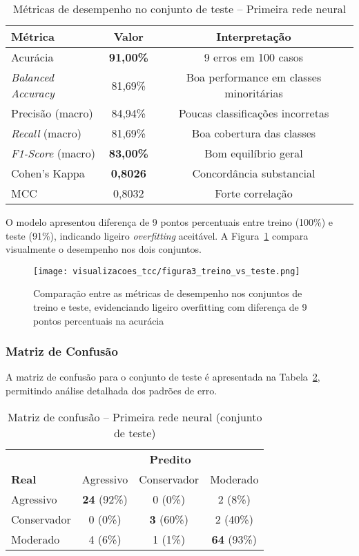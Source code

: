 \begin{table}[htbp]
\centering
\caption{Métricas de desempenho no conjunto de teste -- Primeira rede neural}
\label{tab:metricas_teste_primeira_rede}
\begin{tabular}{@{}lcc@{}}
\toprule
\textbf{Métrica} & \textbf{Valor} & \textbf{Interpretação} \\ \midrule
Acurácia & \textbf{91,00\%} & 9 erros em 100 casos \\
\textit{Balanced Accuracy} & 81,69\% & Boa performance em classes minoritárias \\
Precisão (macro) & 84,94\% & Poucas classificações incorretas \\
\textit{Recall} (macro) & 81,69\% & Boa cobertura das classes \\
\textit{F1-Score} (macro) & \textbf{83,00\%} & Bom equilíbrio geral \\
Cohen's Kappa & \textbf{0,8026} & Concordância substancial \\
MCC & 0,8032 & Forte correlação \\ \bottomrule
\end{tabular}
\end{table}

O modelo apresentou diferença de 9 pontos percentuais entre treino (100\%) e teste (91\%), indicando ligeiro \textit{overfitting} aceitável. A Figura~\ref{fig:treino_vs_teste} compara visualmente o desempenho nos dois conjuntos.

\begin{figure}[htbp]
    \centering
    \texttt{[image: visualizacoes\_tcc/figura3\_treino\_vs\_teste.png]}
    \caption{Comparação entre as métricas de desempenho nos conjuntos de treino e teste, evidenciando ligeiro overfitting com diferença de 9 pontos percentuais na acurácia}
    \label{fig:treino_vs_teste}
\end{figure}

\subsubsection{Matriz de Confusão}

A matriz de confusão para o conjunto de teste é apresentada na Tabela~\ref{tab:matriz_confusao_primeira_rede}, permitindo análise detalhada dos padrões de erro.

\begin{table}[htbp]
\centering
\caption{Matriz de confusão -- Primeira rede neural (conjunto de teste)}
\label{tab:matriz_confusao_primeira_rede}
\begin{tabular}{@{}lccc@{}}
\toprule
 & \multicolumn{3}{c}{\textbf{Predito}} \\ \cmidrule(l){2-4}
\textbf{Real} & Agressivo & Conservador & Moderado \\ \midrule
Agressivo & \textbf{24} (92\%) & 0 (0\%) & 2 (8\%) \\
Conservador & 0 (0\%) & \textbf{3} (60\%) & 2 (40\%) \\
Moderado & 4 (6\%) & 1 (1\%) & \textbf{64} (93\%) \\ \bottomrule
\end{tabular}
\end{table}

